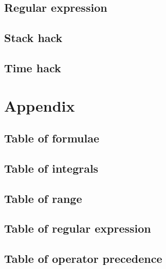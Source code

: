 \documentclass[titlepage,a4paper,10pt]{article}
\begin{document}
\begin{multicols}{2}
\begin{spacing}{0.8}
{			\subsection{Regular expression}
				
			\subsection{Stack hack}
				
			\subsection{Time hack}
				
		\section{Appendix}
			\subsection{Table of formulae}
				
			\subsection{Table of integrals}
				
			\subsection{Table of range}
				
			\subsection{Table of regular expression}
				
			\subsection{Table of operator precedence}
				
		}
		\end{spacing}
		\endgroup
	\end{multicols}
\end{document}
